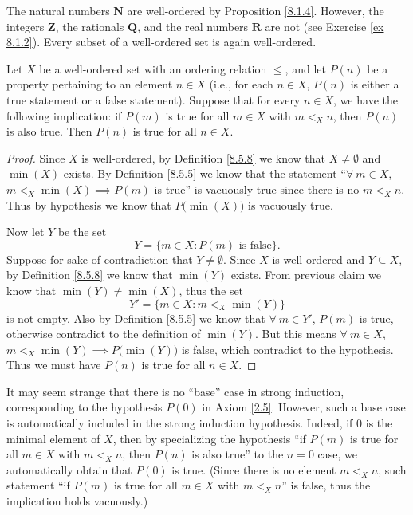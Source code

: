 \begin{example}\label{8.5.9}
    The natural numbers \(\mathbf{N}\) are well-ordered by Proposition \ref{8.1.4}.
    However, the integers \(\mathbf{Z}\), the rationals \(\mathbf{Q}\), and the real numbers \(\mathbf{R}\) are not (see Exercise \ref{ex 8.1.2}).
    Every subset of a well-ordered set is again well-ordered.
\end{example}

\begin{proposition}\label{8.5.10}
    Let \(X\) be a well-ordered set with an ordering relation \(\leq\), and let \(P(n)\) be a property pertaining to an element \(n \in X\)
    (i.e., for each \(n \in X\), \(P(n)\) is either a true statement or a false statement).
    Suppose that for every \(n \in X\), we have the following implication:
    if \(P(m)\) is true for all \(m \in X\) with \(m <_X n\), then \(P(n)\) is also true.
    Then \(P(n)\) is true for all \(n \in X\).
\end{proposition}

\begin{proof}
    Since \(X\) is well-ordered, by Definition \ref{8.5.8} we know that \(X \neq \emptyset\) and \(\min(X)\) exists.
    By Definition \ref{8.5.5} we know that the statement ``\(\forall\ m \in X\), \(m <_X \min(X) \implies P(m)\) is true'' is vacuously true since there is no \(m <_X n\).
    Thus by hypothesis we know that \(P\big(\min(X)\big)\) is vacuously true.

    Now let \(Y\) be the set
    \[
        Y = \{m \in X : P(m) \text{ is false}\}.
    \]
    Suppose for sake of contradiction that \(Y \neq \emptyset\).
    Since \(X\) is well-ordered and \(Y \subseteq X\), by Definition \ref{8.5.8} we know that \(\min(Y)\) exists.
    From previous claim we know that \(\min(Y) \neq \min(X)\), thus the set
    \[
        Y' = \{m \in X : m <_X \min(Y)\}
    \]
    is not empty.
    Also by Definition \ref{8.5.5} we know that \(\forall\ m \in Y'\), \(P(m)\) is true, otherwise contradict to the definition of \(\min(Y)\).
    But this means \(\forall\ m \in X\), \(m <_X \min(Y) \implies P\big(\min(Y)\big)\) is false, which contradict to the hypothesis.
    Thus we must have \(P(n)\) is true for all \(n \in X\).
\end{proof}

\begin{remark}\label{8.5.11}
    It may seem strange that there is no ``base'' case in strong induction, corresponding to the hypothesis \(P(0)\) in Axiom \ref{2.5}.
    However, such a base case is automatically included in the strong induction hypothesis.
    Indeed, if \(0\) is the minimal element of \(X\), then by specializing the hypothesis ``if \(P(m)\) is true for all \(m \in X\) with \(m <_X n\), then \(P(n)\) is also true'' to the \(n = 0\) case, we automatically obtain that \(P(0)\) is true.
    (Since there is no element \(m <_X n\), such statement ``if \(P(m)\) is true for all \(m \in X\) with \(m <_X n\)'' is false, thus the implication holds vacuously.)
\end{remark}

